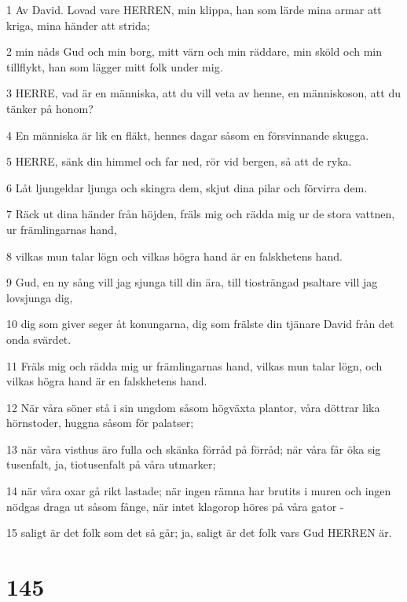 \par 1 Av David. Lovad vare HERREN, min klippa, han som lärde mina armar att kriga, mina händer att strida;
\par 2 min nåds Gud och min borg, mitt värn och min räddare, min sköld och min tillflykt, han som lägger mitt folk under mig.
\par 3 HERRE, vad är en människa, att du vill veta av henne, en människoson, att du tänker på honom?
\par 4 En människa är lik en fläkt, hennes dagar såsom en försvinnande skugga.
\par 5 HERRE, sänk din himmel och far ned, rör vid bergen, så att de ryka.
\par 6 Låt ljungeldar ljunga och skingra dem, skjut dina pilar och förvirra dem.
\par 7 Räck ut dina händer från höjden, fräls mig och rädda mig ur de stora vattnen, ur främlingarnas hand,
\par 8 vilkas mun talar lögn och vilkas högra hand är en falskhetens hand.
\par 9 Gud, en ny sång vill jag sjunga till din ära, till tiosträngad psaltare vill jag lovsjunga dig,
\par 10 dig som giver seger åt konungarna, dig som frälste din tjänare David från det onda svärdet.
\par 11 Fräls mig och rädda mig ur främlingarnas hand, vilkas mun talar lögn, och vilkas högra hand är en falskhetens hand.
\par 12 När våra söner stå i sin ungdom såsom högväxta plantor, våra döttrar lika hörnstoder, huggna såsom för palatser;
\par 13 när våra visthus äro fulla och skänka förråd på förråd; när våra får öka sig tusenfalt, ja, tiotusenfalt på våra utmarker;
\par 14 när våra oxar gå rikt lastade; när ingen rämna har brutits i muren och ingen nödgas draga ut såsom fånge, när intet klagorop höres på våra gator -
\par 15 saligt är det folk som det så går; ja, saligt är det folk vars Gud HERREN är.

\chapter{145}

